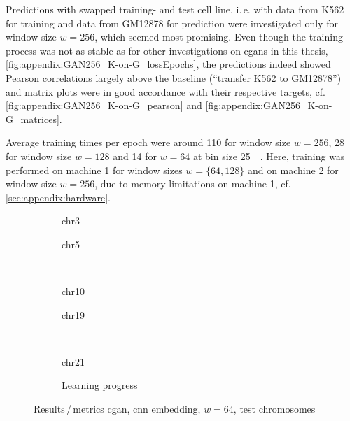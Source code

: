 Predictions with swapped training- and test cell line, i.\,e. with data from K562 for training and data from GM12878 for prediction 
were investigated only for window size $w=256$, which seemed most promising. 
Even though the training process was not as stable as for other investigations on \acrshort{cgan}s in this thesis, \cref{fig:appendix:GAN256_K-on-G_lossEpochs}, 
the predictions indeed showed Pearson correlations largely above the baseline (``transfer K562 to GM12878'') 
and matrix plots were in good accordance with their respective targets, cf. \cref{fig:appendix:GAN256_K-on-G_pearson} and \ref{fig:appendix:GAN256_K-on-G_matrices}.

Average training times per epoch were around \SI{110}{\min} for window size $w=256$,
\SI{28}{\min} for window size $w=128$  and \SI{14}{\min} for $w=64$ at bin size \SI{25}{\kilo\bp}.
Here, training was performed on machine 1 for window sizes $w=\{64,128\}$ and on machine 2 for window size $w=256$,
due to memory limitations on machine 1, cf. \cref{sec:appendix:hardware}.
\begin{figure}[p] %
    \begin{subfigure}{0.45\textwidth}
        \scriptsize
        \caption{chr3}
    \end{subfigure} \hfill
    \begin{subfigure}{0.45\textwidth}
        \scriptsize
        \caption{chr5}
    \end{subfigure}\\[5mm]
    \begin{subfigure}{0.45\textwidth}
        \scriptsize
        \caption{chr10}
    \end{subfigure}\hfill
    \begin{subfigure}{0.45\textwidth}
        \scriptsize
        \caption{chr19}
    \end{subfigure}\\[3mm]
    \begin{subfigure}{0.45\textwidth}
        \scriptsize
        \caption{chr21}
    \end{subfigure} \hfill
    \begin{subfigure}{0.45\textwidth}
        \scriptsize
        \caption{Learning progress} \label{fig:results:cGAN64_lossEpochs}
    \end{subfigure}
    \caption{Results\,/\,metrics \acrshort{cgan}, \acrshort{cnn} embedding, $w=64$, test chromosomes}   \label{fig:results:cGAN64_pearson}
\end{figure}

